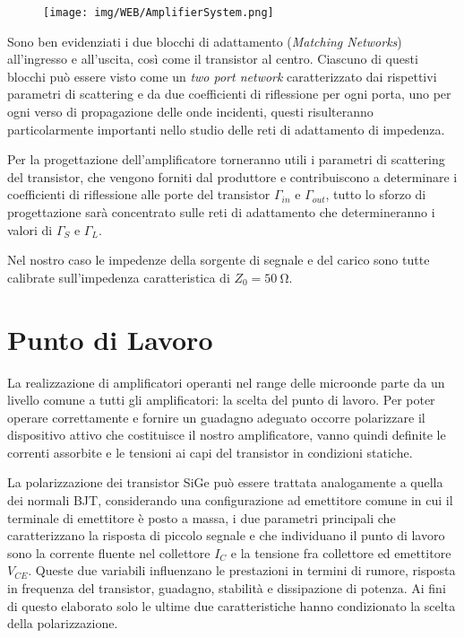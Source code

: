\documentclass[12pt,oneside]{book}
\begin{document}
\begin{figure}[!htbp]
    \centering
    \texttt{[image: img/WEB/AmplifierSystem.png]}
    \caption{}
    \label{amp_sist}
\end{figure}
Sono ben evidenziati i due blocchi di adattamento (\textit{Matching Networks}) all'ingresso e all'uscita, così come il transistor al centro. Ciascuno di questi blocchi può essere visto come un \textit{two port network} caratterizzato dai rispettivi parametri di scattering e da due coefficienti di riflessione per ogni porta, uno per ogni verso di propagazione delle onde incidenti, questi risulteranno particolarmente importanti nello studio delle reti di adattamento di impedenza.

Per la progettazione dell'amplificatore torneranno utili i parametri di scattering del transistor, che vengono forniti dal produttore e contribuiscono a determinare i coefficienti di riflessione alle porte del transistor $\Gamma_{in}$ e $\Gamma_{out}$, tutto lo sforzo di progettazione sarà concentrato sulle reti di adattamento che determineranno i valori di $\Gamma_{S}$ e $\Gamma_{L}$.

Nel nostro caso le impedenze della sorgente di segnale e del carico sono tutte calibrate sull'impedenza caratteristica di $Z_{0}=\SI{50}{\ohm}$.

\section{Punto di Lavoro}
\label{sub_q_point}
La realizzazione di amplificatori operanti nel range delle microonde parte da un livello comune a tutti gli amplificatori: la scelta del punto di lavoro. Per poter operare correttamente e fornire un guadagno adeguato occorre polarizzare il dispositivo attivo che costituisce il nostro amplificatore, vanno quindi definite le correnti assorbite e le tensioni ai capi del transistor in condizioni statiche.

La polarizzazione dei transistor SiGe può essere trattata analogamente a quella dei normali BJT, considerando una configurazione ad emettitore comune in cui il terminale di emettitore è posto a massa, i due parametri principali che caratterizzano la risposta di piccolo segnale e che individuano il punto di lavoro sono la corrente fluente nel collettore $I_C$ e la tensione fra collettore ed emettitore $V_{CE}$. Queste due variabili influenzano le prestazioni in termini di rumore, risposta in frequenza del transistor, guadagno, stabilità e dissipazione di potenza. Ai fini di questo elaborato solo le ultime due caratteristiche hanno condizionato la scelta della polarizzazione.
\end{document}
